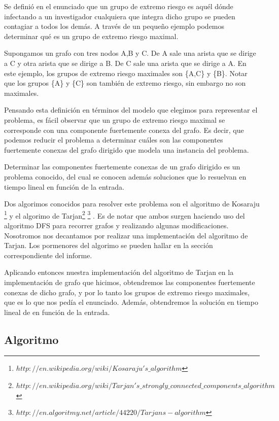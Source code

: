 \quad Se definió en el enunciado que un grupo de extremo riesgo es aquél dónde infectando a un investigador cualquiera que integra dicho grupo se pueden contagiar a todos los demás. A través de un pequeño ejemplo podemos determinar qué es un grupo de extremo riesgo maximal.

\quad Supongamos un grafo con tres nodos A,B y C. De A sale una arista que se dirige a C y otra arista que se dirige a B. De C sale una arista que se dirige a A. En este ejemplo, los grupos de extremo riesgo maximales son \{A,C\} y \{B\}. Notar que los grupos \{A\} y \{C\} son también de extremo riesgo, sin embargo no son maximales.

\quad Pensando esta definición en términos del modelo que elegimos para representar el problema, es fácil observar que un grupo de extremo riesgo maximal se corresponde con una componente fuertemente conexa del grafo. Es decir, que podemos reducir el problema a determinar cuáles son las componentes fuertemente conexas del grafo dirigido que modela una instancia del problema.
 
\quad Determinar las componentes fuertemente conexas de un grafo dirigido es un problema conocido, del cual se conocen además soluciones que lo resuelvan en tiempo lineal en función de la entrada.

\quad Dos algorimos conocidos para resolver este problema son el algoritmo de Kosaraju \footnote{$http://en.wikipedia.org/wiki/Kosaraju's\_algorithm$} y el algorimo de Tarjan\footnote{$http://en.wikipedia.org/wiki/Tarjan's\_strongly\_connected\_components\_algorithm$} \footnote{$http://en.algoritmy.net/article/44220/Tarjans-algorithm$} . Es de notar que ambos surgen haciendo uso del algoritmo DFS para recorrer grafos y realizando algunas modificaciones.  Nosotromos nos decantamos por realizar una implementación del algoritmo de Tarjan. Los pormenores del algorimo se pueden hallar en la sección correspondiente del informe.

\quad Aplicando entonces nuestra implementación del algoritmo de Tarjan en la implementación de grafo que hicimos, obtendremos las componentes fuertemente conexas de dicho grafo, y por lo tanto los grupos de extremo riesgo maximales, que es lo que nos pedía el enunciado. Además, obtendremos la solución en tiempo lineal de en función de la entrada.


\subsection{Algoritmo} 

